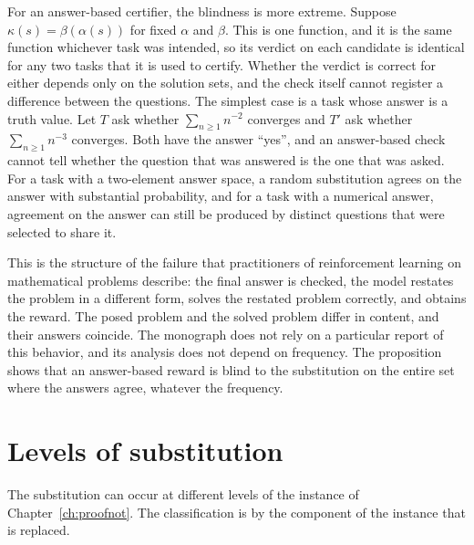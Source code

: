 For an answer-based certifier, the blindness is more extreme. Suppose $\kappa(s)=\beta(\alpha(s))$ for fixed $\alpha$ and $\beta$. This is one function, and it is the same function whichever task was intended, so its verdict on each candidate is identical for any two tasks that it is used to certify. Whether the verdict is correct for either depends only on the solution sets, and the check itself cannot register a difference between the questions. The simplest case is a task whose answer is a truth value. Let $T$ ask whether $\sum_{n\ge 1} n^{-2}$ converges and $T'$ ask whether $\sum_{n\ge 1} n^{-3}$ converges. Both have the answer ``yes'', and an answer-based check cannot tell whether the question that was answered is the one that was asked. For a task with a two-element answer space, a random substitution agrees on the answer with substantial probability, and for a task with a numerical answer, agreement on the answer can still be produced by distinct questions that were selected to share it.

This is the structure of the failure that practitioners of reinforcement learning on mathematical problems describe: the final answer is checked, the model restates the problem in a different form, solves the restated problem correctly, and obtains the reward. The posed problem and the solved problem differ in content, and their answers coincide. The monograph does not rely on a particular report of this behavior, and its analysis does not depend on frequency. The proposition shows that an answer-based reward is blind to the substitution on the entire set where the answers agree, whatever the frequency.

\section{Levels of substitution}

The substitution can occur at different levels of the instance of Chapter~\ref{ch:proofnot}. The classification is by the component of the instance that is replaced.

